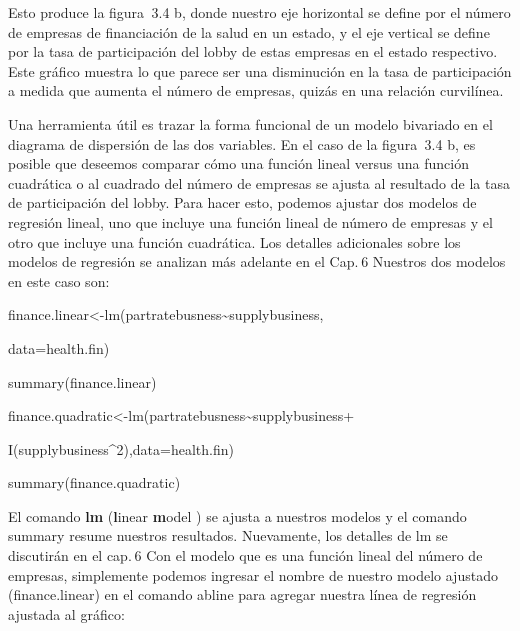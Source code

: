 \documentclass[
]{book}
\newenvironment{Shaded}{\begin{snugshade}}{\end{snugshade}}
\newcommand{\AttributeTok}[1]{\textcolor[rgb]{0.77,0.63,0.00}{#1}}
\newcommand{\DecValTok}[1]{\textcolor[rgb]{0.00,0.00,0.81}{#1}}
\newcommand{\FunctionTok}[1]{\textcolor[rgb]{0.00,0.00,0.00}{#1}}
\newcommand{\NormalTok}[1]{#1}
\newcommand{\OtherTok}[1]{\textcolor[rgb]{0.56,0.35,0.01}{#1}}
\newcommand{\SpecialCharTok}[1]{\textcolor[rgb]{0.00,0.00,0.00}{#1}}
\begin{document}
Esto produce la figura  3.4 b, donde nuestro eje horizontal se define por el número de empresas de financiación de la salud en un estado, y el eje vertical se define por la tasa de participación del lobby de estas empresas en el estado respectivo. Este gráfico muestra lo que parece ser una disminución en la tasa de participación a medida que aumenta el número de empresas, quizás en una relación curvilínea.

Una herramienta útil es trazar la forma funcional de un modelo bivariado en el diagrama de dispersión de las dos variables. En el caso de la figura  3.4 b, es posible que deseemos comparar cómo una función lineal versus una función cuadrática o al cuadrado del número de empresas se ajusta al resultado de la tasa de participación del lobby. Para hacer esto, podemos ajustar dos modelos de regresión lineal, uno que incluye una función lineal de número de empresas y el otro que incluye una función cuadrática. Los detalles adicionales sobre los modelos de regresión se analizan más adelante en el Cap. 6 Nuestros dos modelos en este caso son:

\begin{Shaded}
\begin{Highlighting}[]
\NormalTok{finance.linear}\OtherTok{\textless{}{-}}\FunctionTok{lm}\NormalTok{(partratebusness}\SpecialCharTok{\textasciitilde{}}\NormalTok{supplybusiness,}

     \AttributeTok{data=}\NormalTok{health.fin)}

\FunctionTok{summary}\NormalTok{(finance.linear)}

\NormalTok{finance.quadratic}\OtherTok{\textless{}{-}}\FunctionTok{lm}\NormalTok{(partratebusness}\SpecialCharTok{\textasciitilde{}}\NormalTok{supplybusiness}\SpecialCharTok{+}

     \FunctionTok{I}\NormalTok{(supplybusiness}\SpecialCharTok{\^{}}\DecValTok{2}\NormalTok{),}\AttributeTok{data=}\NormalTok{health.fin)}

\FunctionTok{summary}\NormalTok{(finance.quadratic)}
\end{Highlighting}
\end{Shaded}

El comando \textbf{lm} (\textbf{l}inear \textbf{m}odel ) se ajusta a nuestros modelos y el comando summary resume nuestros resultados. Nuevamente, los detalles de lm se discutirán en el cap. 6 Con el modelo que es una función lineal del número de empresas, simplemente podemos ingresar el nombre de nuestro modelo ajustado (finance.linear) en el comando abline para agregar nuestra línea de regresión ajustada al gráfico:
\end{document}
